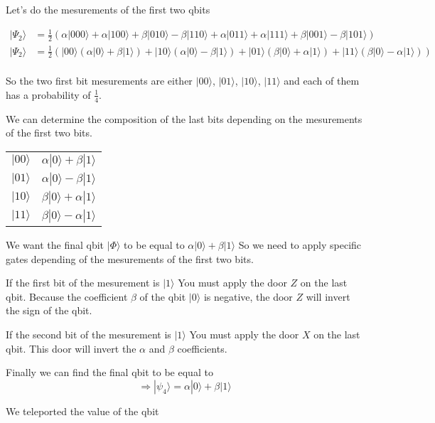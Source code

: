 \documentclass{article}
\begin{document}
Let's do the mesurements of the first two qbits

\begin{equation}
    \begin{split}
        |\Psi_2\rangle & = \frac{1}{2}(\alpha|000\rangle + \alpha|100\rangle
            + \beta|010\rangle - \beta|110\rangle
            + \alpha|011\rangle + \alpha|111\rangle
            + \beta|001\rangle - \beta|101\rangle) \\
        |\Psi_2\rangle & = \frac{1}{2}(|00\rangle(\alpha|0\rangle + \beta|1\rangle)
            + |10\rangle(\alpha|0\rangle - \beta|1\rangle)
            + |01\rangle(\beta|0\rangle + \alpha|1\rangle)
            + |11\rangle(\beta|0\rangle - \alpha|1\rangle)) \\
    \end{split}
\end{equation}

So the two first bit mesurements are either $|00\rangle$, $|01\rangle$, $|10\rangle$, $|11\rangle$
and each of them has a probability of $\frac{1}{4}$.

We can determine the composition of the last bits depending on the mesurements of the first two bits.
\begin{tabular}{|c|c|}
    \hline
        $|00\rangle$ & $\alpha|0\rangle + \beta|1\rangle$ \\
        $|01\rangle$ & $\alpha|0\rangle - \beta|1\rangle$ \\
        $|10\rangle$ & $\beta|0\rangle + \alpha|1\rangle$ \\
        $|11\rangle$ & $\beta|0\rangle - \alpha|1\rangle$ \\
    \hline
\end{tabular}

We want the final qbit $|\Phi\rangle$ to be equal to $\alpha|0\rangle + \beta|1\rangle$
So we need to apply specific gates depending of the mesurements of the first two bits.

If the first bit of the mesurement is $|1\rangle$ You must apply the door $Z$ on the last qbit.
Because the coefficient $\beta$ of the qbit $|0\rangle$ is negative, the door $Z$ will invert the sign of the qbit.

If the second bit of the mesurement is $|1\rangle$ You must apply the door $X$ on the last qbit.
This door will invert the $\alpha$ and $\beta$ coefficients.

Finally we can find the final qbit to be equal to 
\begin{equation}
    \Longrightarrow |\psi_4\rangle = \alpha|0\rangle + \beta|1\rangle
\end{equation}

We teleported the value of the qbit
\end{document}
